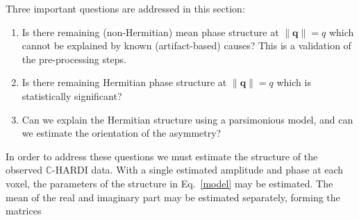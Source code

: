 \documentclass[authoryear,preprint,12pt]{elsarticle}
\newcommand{\q}{\mathbf{q}}
\newcommand{\bbC}{\mathbb{C}}
\begin{document}
Three important questions are addressed in this section:
\begin{enumerate}
\item Is there remaining (non-Hermitian) mean phase structure at
  $\|\q\|=q$ which cannot be explained by known (artifact-based) causes?
  This is a validation of the pre-processing steps.
\item Is there remaining Hermitian phase structure at $\|\q\|=q$ which
  is statistically significant? 
\item Can we explain the Hermitian structure using a parsimonious
  model, and can we estimate the orientation of the asymmetry?
\end{enumerate}
In order to address these questions we must estimate the structure of
the observed $\bbC$-HARDI data.  With a single estimated amplitude and
phase at each voxel, the parameters of the structure in
Eq.~\eqref{model} may be estimated.  The mean of the real and
imaginary part may be estimated separately, forming the matrices
\end{document}
